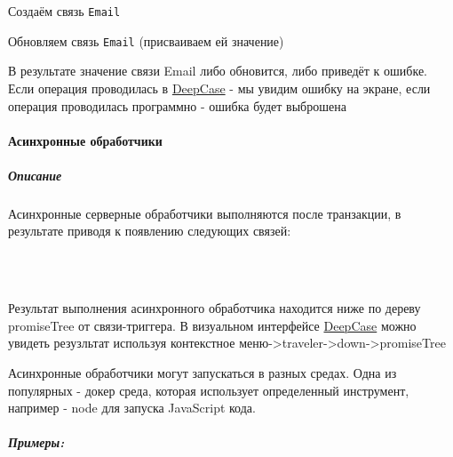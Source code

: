 \documentclass{article}
\begin{document}
Создаём связь \texttt{Email}

Обновляем связь \texttt{Email} (присваиваем ей значение)

В результате значение связи Email либо обновится, либо приведёт к ошибке.
Если операция проводилась в \hyperlink{DeepCase.Def}{DeepCase} - мы увидим
ошибку на экране, если
операция проводилась программно - ошибка будет выброшена

\paragraph{Асинхронные обработчики}
\subparagraph{Описание}
Асинхронные серверные обработчики выполняются после транзакции, в результате
приводя к появлению следующих связей: \\
\newenvironment{handler_success_result_info}
{%
  \noindent При успешном выполнении: Связь\textendash триггер \textendash
  Then\textendash > Promise \textendash Resolved\textendash > \\
  PromiseResult {(с object value)}
}
{}
\newenvironment{handler_fail_result_info}
{%
  При ошибке: Связь\textendash триггер \textendash Then\textendash > Promise
  \textendash Rejected\textendash > PromiseResult {(с object value)}
}
{}
\begin{handler_success_result_info}
\end{handler_success_result_info}\\
\begin{handler_fail_result_info}
\end{handler_fail_result_info}\\
Результат выполнения асинхронного обработчика находится ниже по дереву
promiseTree от связи-триггера. В визуальном интерфейсе
\hyperlink{DeepCase.Def}{DeepCase} можно увидеть
резузльтат используя контекстное меню->traveler->down->promiseTree

Асинхронные обработчики могут запускаться в разных средах. Одна из популярных -
докер среда, которая использует определенный инструмент, например - node для
запуска JavaScript кода.
\subparagraph{Примеры:}
\end{document}
